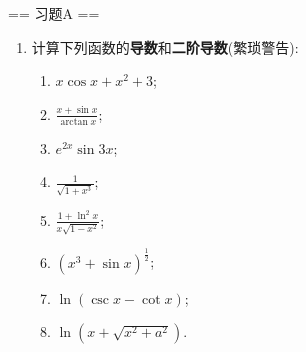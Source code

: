 \newenvironment{solution}{\begin{proofc}[解答]}{\end{proofc}}

== 习题A ==

\begin{enumerate}
    \item[1.]计算下列函数的\textbf{导数}和\textbf{二阶导数}(繁琐警告):
    \begin{enumerate}
        \item[(a)]$\displaystyle x\cos x + x^{2} + 3$;
        \item[(b)]$\displaystyle \frac{x + \sin x}{\arctan x}$;
        \item[(c)]$\displaystyle e^{2x}\sin 3x$;
        \item[(d)]$\displaystyle \frac{1}{\sqrt{1 + x^{3}}}$;
        \item[(e)]$\displaystyle \frac{1 + \ln^{2}x}{x\sqrt{1 - x^{2}}}$;
        \item[(f)]$\displaystyle (x^{3} + \sin x)^{\frac{1}{2}}$;
        \item[(g)]$\displaystyle \ln (\csc x - \cot x)$;
        \item[(h)]$\displaystyle \ln (x + \sqrt{x^{2} + a^{2}})$.
    \end{enumerate}
    

\end{enumerate}
